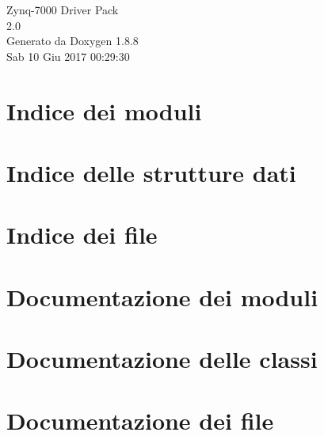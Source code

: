 \documentclass[twoside]{book}
\newcommand{\+}{\discretionary{\mbox{\scriptsize$\hookleftarrow$}}{}{}}
\newcommand{\clearemptydoublepage}{%
  \newpage{\pagestyle{empty}\cleardoublepage}%
}
\begin{document}
\hypersetup{pageanchor=false,
             bookmarks=true,
             bookmarksnumbered=true,
             pdfencoding=unicode
            }
\begin{titlepage}
\vspace*{7cm}
\begin{center}%
{\Large Zynq-\/7000 Driver Pack \\[1ex]\large 2.\+0 }\\
\vspace*{1cm}
{\large Generato da Doxygen 1.8.8}\\
\vspace*{0.5cm}
{\small Sab 10 Giu 2017 00:29:30}\\
\end{center}
\end{titlepage}
\clearemptydoublepage
\tableofcontents
\clearemptydoublepage
{}
\hypersetup{pageanchor=true}

\chapter{Indice dei moduli}

\chapter{Indice delle strutture dati}

\chapter{Indice dei file}

\chapter{Documentazione dei moduli}







\chapter{Documentazione delle classi}





\chapter{Documentazione dei file}












\newpage
{}
{}
\printindex
\end{document}
